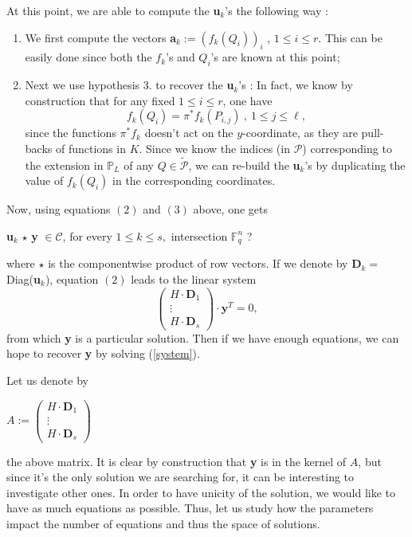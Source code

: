 \documentclass[10pt]{article}
\newcommand{\s}{\vspace{0.3cm}}
\newcommand{\cd}{\cdot}
\newcommand{\PP}{\mathbb{P}}
\newcommand{\fq}{\mathbb{F}_q}
\newcommand{\PR}{\mathcal{P}}
\begin{document}
At this point, we are able to compute the \textbf{u}$_{k}$'s the following way :
\begin{enumerate}
\item We first compute the vectors \textbf{a}$_{k} := (f_k(Q_i))_i$ , $1 \leq i \leq r$. This can be easily done since both the $f_k$'s and $Q_i$'s are known at this point;
\item Next we use hypothesis $3.$ to recover the \textbf{u}$_{k}$'s : In fact, we know by construction that for any fixed $1 \leq i \leq r$, one have 
\[f_k(Q_i) = \pi^*f_k(P_{i,j}) \ , \ 1 \leq j \leq \ell,\]
since the functions $\pi^*f_k$ doesn't act on the $y$-coordinate, as they are pull-backs of functions in $K$. Since we know the indices (in $\PR$) corresponding to the extension in $\PP_L$ of any $Q \in \tilde{\PR}$, we can re-build the \textbf{u}$_{k}$'s by duplicating the value of $f_k(Q_i)$ in the corresponding coordinates.
\end{enumerate}

Now, using equations $(2)$ and $(3)$ above, one gets 
\begin{center}
\textbf{u}$_{k}$ $\star$ \textbf{y} $\in \mathcal{C}$, for every $1 \leq k \leq s,$ \color{red} intersection $\fq^n$ ? \color{black}
\end{center}
where $\star$ is the componentwise product of row vectors.
If we denote by \textbf{D}$_{k} = $ Diag(\textbf{u}$_{k}$), equation $(2)$ leads to the linear system 
\begin{equation} \label{system}
\begin{pmatrix}
H \cd \textbf{D}_1 \\
\vdots \\
H \cd \textbf{D}_s
\end{pmatrix}
\cd \textbf{y}^T = 0, 
\end{equation}
from which \textbf{y} is a particular solution.
Then if we have enough equations, we can hope to recover \textbf{y} by solving (\ref{system}). 

\s

 Let us denote by
\begin{center}
$A := \begin{pmatrix}
H \cd \textbf{D}_1 \\
\vdots \\
H \cd \textbf{D}_s
\end{pmatrix}
$
\end{center}
the above matrix. It is clear by construction that \textbf{y} is in the kernel of $A$, but since it's the only solution we are searching for, it can be interesting to investigate other ones. In order to have unicity of the solution, we would like to have as much equations as possible. Thus, let us study how the parameters impact the number of equations and thus the space of solutions.
\end{document}
